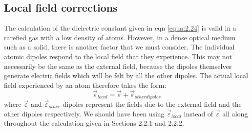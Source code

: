 \documentclass[12pt]{book}
\begin{document}
\subsection{Local field corrections}


The calculation of the dielectric constant given in eqn \ref{equa:2.24} is valid in a rarefied gas with a low density of atoms. However, in a dense optical medium such as a solid, there is another factor that we must consider. The individual atomic dipoles respond to the local field that they experience. This may not necessarily be the same as the external field, because the dipoles themselves generate electric fields which will be felt by all the other dipoles. The actual local field experienced by an atom therefore takes the form:
\begin{equation}\label{equa:2.27}
  \vec{\varepsilon}_{local}=\vec{\varepsilon}+\vec{\varepsilon}_{other dipoles}
\end{equation}
where $\vec{\varepsilon}$ and $\vec{\varepsilon}_{other}$ dipoles represent the fields due to the external field and the other dipoles respectively. We should have been using $\vec{\varepsilon}_{local}$ instead of $\vec{\varepsilon}$ all along throughout the calculation given in Sections 2.2.1 and 2.2.2.
\end{document}
